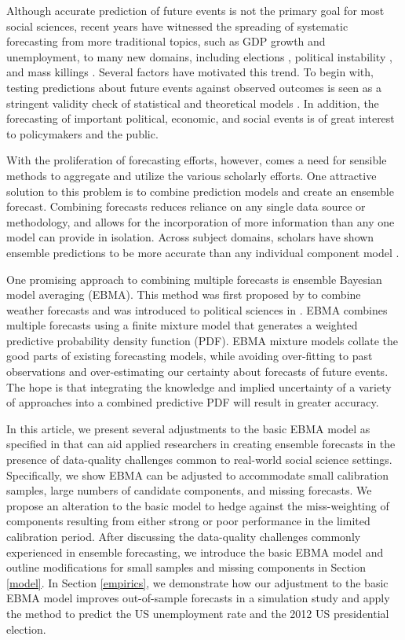 \documentclass[12pt,fullpage,endnotes]{article}
\begin{document}
Although accurate prediction of future events is not the primary goal
for most social sciences, recent years have witnessed the spreading of
systematic forecasting from more traditional topics, such as GDP growth
and unemployment, to many new domains, including elections
\citep[e.g.,][]{Linzer:2013}, political instability
\citep[e.g.,][]{Goldstone:etal:2010}, and mass killings
\citep{Ulfelder:2012}. Several factors have motivated this trend. To begin
with, testing predictions about future events against observed
outcomes is seen as a stringent validity check of statistical and
theoretical models \citep{wgb:2010}. In addition, the forecasting of
important political, economic, and social events is of great interest
to policymakers and the public.


With the proliferation of forecasting efforts, however, comes a need
for sensible methods to aggregate and utilize the various scholarly
efforts. One attractive solution to this problem is to combine
prediction models and create an ensemble forecast. Combining forecasts
reduces reliance on any single data source or methodology, and allows
for the incorporation of more information than any one model can
provide in isolation. Across subject domains, scholars have shown
ensemble predictions to be more accurate than any individual component
model \citep{Bates:1969,Armstrong:2001,Raftery:2005}.

One promising approach to combining multiple forecasts is ensemble
Bayesian model averaging (EBMA). This method was first proposed by
\citet{Raftery:2005} to combine weather forecasts and was introduced
to political sciences in \citet{mhw:2012}. EBMA combines multiple
forecasts using a finite mixture model that generates a weighted
predictive probability density function (PDF). EBMA mixture models
collate the good parts of existing forecasting models, while
avoiding over-fitting to past observations and over-estimating our
certainty about forecasts of future events. The hope is that
integrating the knowledge and implied uncertainty of a variety of
approaches into a combined predictive PDF will result in greater
accuracy.

In this article, we present several adjustments to the basic EBMA
model as specified in \citet{mhw:2012} that can aid applied
researchers in creating ensemble forecasts in the presence of
data-quality challenges common to real-world social science settings.
Specifically, we show EBMA can be adjusted to accommodate small
calibration samples, large numbers of candidate components, and
missing forecasts.  We propose an alteration to the basic model to
hedge against the miss-weighting of components resulting from either
strong or poor performance in the limited calibration period.  After
discussing the data-quality challenges commonly experienced in
ensemble forecasting, we introduce the basic EBMA model and outline
modifications for small samples and missing components in Section
\ref{model}. In Section \ref{empirics}, we demonstrate how our
adjustment to the basic EBMA model improves out-of-sample forecasts in
a simulation study and apply the method to predict the
US unemployment rate and the 2012 US presidential election.
\end{document}
